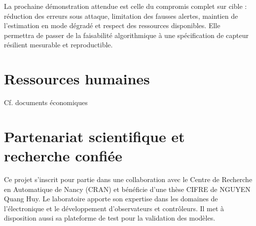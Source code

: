 \documentclass[11pt,a4paper]{article}
\begin{document}
La prochaine démonstration attendue est celle du compromis complet sur cible : réduction des erreurs sous attaque, limitation des fausses alertes, maintien de l'estimation en mode dégradé et respect des ressources disponibles. Elle permettra de passer de la faisabilité algorithmique à une spécification de capteur résilient mesurable et reproductible.
\FloatBarrier

\FloatBarrier
\section{Ressources humaines}

Cf. documents économiques 

\section{Partenariat scientifique et recherche confiée}

Ce projet s’inscrit pour partie dans une collaboration avec le Centre de Recherche en Automatique de Nancy (CRAN) et bénéficie d’une thèse CIFRE de NGUYEN Quang Huy. Le laboratoire apporte son expertise dans les domaines de l’électronique et le développement d’observateurs et contrôleurs. Il met à disposition aussi sa plateforme de test pour la validation des modèles.
\end{document}
